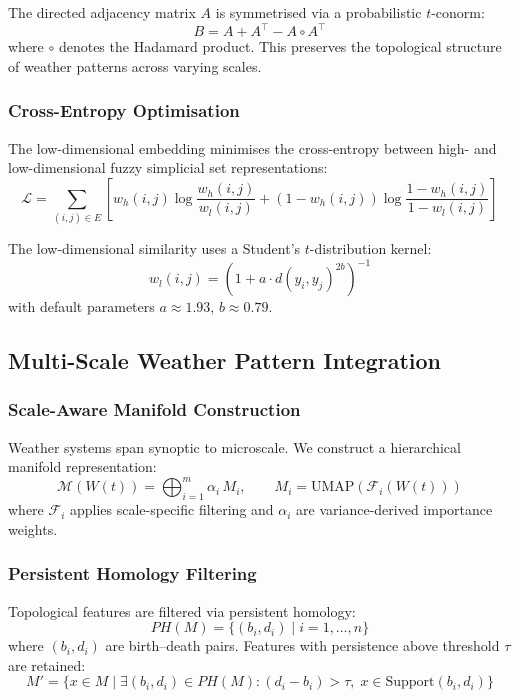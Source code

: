 \documentclass{article}
\begin{document}
The directed adjacency matrix $A$ is symmetrised via a probabilistic $t$-conorm:
\begin{equation}
    B = A + A^\top - A \circ A^\top
\end{equation}
where $\circ$ denotes the Hadamard product. This preserves the topological structure of
weather patterns across varying scales.

\subsubsection{Cross-Entropy Optimisation}
The low-dimensional embedding minimises the cross-entropy between high- and
low-dimensional fuzzy simplicial set representations:
\begin{equation}
    \mathcal{L} = \sum_{(i,j) \in E} \left[
        w_h(i,j) \log \frac{w_h(i,j)}{w_l(i,j)}
        + (1 - w_h(i,j)) \log \frac{1 - w_h(i,j)}{1 - w_l(i,j)}
    \right]
\end{equation}

The low-dimensional similarity uses a Student's $t$-distribution kernel:
\begin{equation}
    w_l(i,j) = \left(1 + a \cdot d(y_i, y_j)^{2b}\right)^{-1}
\end{equation}
with default parameters $a \approx 1.93$, $b \approx 0.79$.

\subsection{Multi-Scale Weather Pattern Integration}

\subsubsection{Scale-Aware Manifold Construction}
Weather systems span synoptic to microscale. We construct a hierarchical manifold
representation:
\begin{equation}
    \mathcal{M}(W(t)) = \bigoplus_{i=1}^{m} \alpha_i \, M_i,
    \qquad M_i = \text{UMAP}(\mathcal{F}_i(W(t)))
\end{equation}
where $\mathcal{F}_i$ applies scale-specific filtering and $\alpha_i$ are
variance-derived importance weights.

\subsubsection{Persistent Homology Filtering}
Topological features are filtered via persistent homology:
\begin{equation}
    PH(M) = \{(b_i, d_i) \mid i = 1, \ldots, n\}
\end{equation}
where $(b_i, d_i)$ are birth--death pairs. Features with persistence above threshold
$\tau$ are retained:
\begin{equation}
    M' = \{x \in M \mid \exists (b_i, d_i) \in PH(M) : (d_i - b_i) > \tau,\;
    x \in \text{Support}(b_i, d_i)\}
\end{equation}
\end{document}
